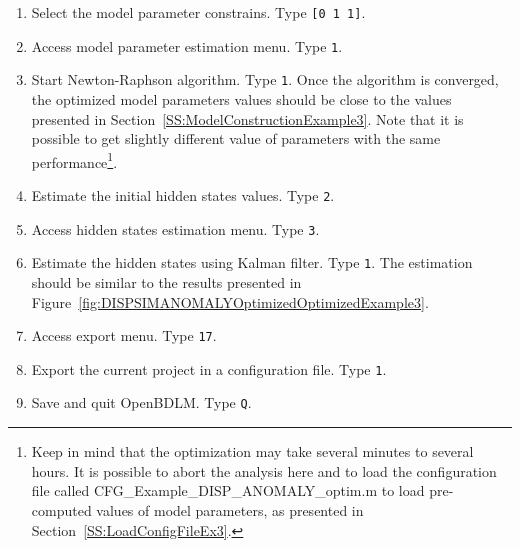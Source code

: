 \begin{enumerate}
\item Select the model parameter constrains. Type \colorbox{light-gray}{\lstinline[basicstyle = \mlttfamily \small, backgroundcolor = \color{light-gray}]![0 1 1]!}.
\item Access model parameter estimation menu. Type \colorbox{light-gray}{\lstinline[basicstyle = \mlttfamily \small, backgroundcolor = \color{light-gray}]!1!}. 
\item Start Newton-Raphson algorithm. Type \colorbox{light-gray}{\lstinline[basicstyle = \mlttfamily \small, backgroundcolor = \color{light-gray}]!1!}. Once the algorithm is converged, the optimized model parameters values should be close to the values presented in Section~\ref{SS:ModelConstructionExample3}. Note that it is possible to get slightly different value of parameters with the same performance\footnote{Keep in mind that the optimization may take several minutes to several hours. It is possible to abort the analysis here and to load the configuration file called CFG\_Example\_DISP\_ANOMALY\_optim.m to load pre-computed values of model parameters, as presented in Section~\ref{SS:LoadConfigFileEx3}.}.
\item Estimate the initial hidden states values. Type \colorbox{light-gray}{\lstinline[basicstyle = \mlttfamily \small, backgroundcolor = \color{light-gray}]!2!}.
\item Access hidden states estimation menu. Type \colorbox{light-gray}{\lstinline[basicstyle = \mlttfamily \small, backgroundcolor = \color{light-gray}]!3!}. 
\item Estimate the hidden states using Kalman filter. Type \colorbox{light-gray}{\lstinline[basicstyle = \mlttfamily \small, backgroundcolor = \color{light-gray}]!1!}. The estimation should be similar to the results presented in Figure~\ref{fig:DISPSIMANOMALYOptimizedOptimizedExample3}.
\item Access export menu. Type \colorbox{light-gray}{\lstinline[basicstyle = \mlttfamily \small, backgroundcolor = \color{light-gray}]!17!}. 
\item Export the current project in a configuration file. Type \colorbox{light-gray}{\lstinline[basicstyle = \mlttfamily \small, backgroundcolor = \color{light-gray}]!1!}.
\item Save and quit OpenBDLM. Type \colorbox{light-gray}{\lstinline[basicstyle = \mlttfamily \small, backgroundcolor = \color{light-gray}]!Q!}.
\end{enumerate}


